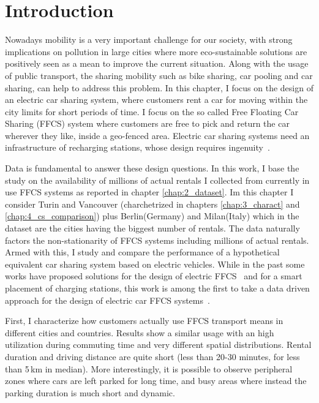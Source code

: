 \section{Introduction}
\label{sec:intro}

Nowadays mobility is a very important challenge for our society, with strong implications on pollution in large cities where more eco-sustainable solutions are positively seen as a mean to improve the current situation.
Along with the usage of public transport, the sharing mobility such as bike sharing, car pooling and car sharing, can help to address this problem. In this chapter,  I focus on the design of an electric car sharing system, where customers rent a car for moving within the city limits for short periods of time. I focus on the so called Free Floating Car Sharing (FFCS) system where customers are free to pick and return the car wherever they like, inside a geo-fenced area.
Electric car sharing systems need an infrastructure of recharging stations, whose design requires ingenuity~\cite{PlacementAndPowergrid,placementAustin,mipCSPpechino}. 


Data is fundamental to answer these design questions. In this work, I base the study on the availability of millions of actual rentals I collected from currently in use FFCS systems as reported in chapter \ref{chap:2_dataset}. Im this chapter I consider Turin and Vancouver (charchetrized in chapters \ref{chap:3_charact} and \ref{chap:4_cs_comparison}) plus Berlin(Germany) and Milan(Italy) which in the dataset are the cities having the biggest number of rentals.
The data naturally factors the non-stationarity of FFCS systems including millions of actual rentals. Armed with this, I study and compare the performance of a hypothetical equivalent car sharing system based on electric vehicles.  While in the past some works have proposed solutions for the design of electric FFCS~\cite{FM15,WB15} and for a smart placement of charging stations, this work is among the first to take a data driven approach for the design of electric car FFCS systems~\cite{ChargingStationForVehicularNetworks,mipCSPpechino,PlacementAndPowergrid,placementAustin}.

First, I characterize how customers actually use FFCS transport means in different cities and countries. Results show a similar usage with an high utilization during commuting time and very different spatial distributions. Rental duration and driving distance are quite short (less than 20-30 minutes, for less than 5\,km in median). More interestingly, it is possible to observe peripheral zones where cars are left parked for long time, and busy areas where instead the parking duration is much short and dynamic.

